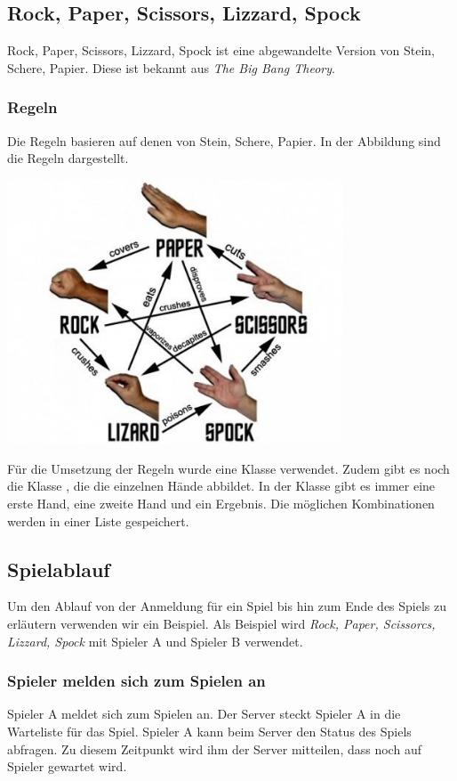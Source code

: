 \subsection{Rock, Paper, Scissors, Lizzard, Spock}
Rock, Paper, Scissors, Lizzard, Spock ist eine abgewandelte Version von Stein, Schere, Papier. Diese ist bekannt aus \textit{The Big Bang Theory}. 

\subsubsection{Regeln}
Die Regeln basieren auf denen von Stein, Schere, Papier. In der Abbildung sind die Regeln dargestellt.

\begin{capfigure}
	\includegraphics[width=10cm]{images/rpssl_rules}
\end{capfigure}

Für die Umsetzung der Regeln wurde eine Klasse  verwendet. Zudem gibt es noch die Klasse , die die einzelnen Hände abbildet. In der Klasse  gibt es immer eine erste Hand, eine zweite Hand und ein Ergebnis. Die möglichen Kombinationen werden in einer Liste gespeichert.

\subsection{Spielablauf}
Um den Ablauf von der Anmeldung für ein Spiel bis hin zum Ende des Spiels zu erläutern verwenden wir ein Beispiel. Als Beispiel wird \textit{Rock, Paper, Scissorcs, Lizzard, Spock} mit Spieler A und Spieler B verwendet.

\subsubsection{Spieler melden sich zum Spielen an}
Spieler A meldet sich zum Spielen an. Der Server steckt Spieler A in die Warteliste für das Spiel. Spieler A kann beim Server den Status des Spiels abfragen. Zu diesem Zeitpunkt wird ihm der Server mitteilen, dass noch auf Spieler gewartet wird.

